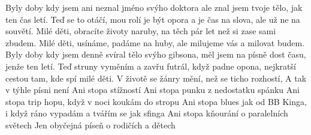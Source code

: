 \ve{}
Byly doby kdy jsem ani neznal jméno svýho doktora
ale znal jsem tvoje tělo, jak ten čas letí.
Teď se to otáčí, mou rolí je být opora
a je čas na slova, ale už ne na souvětí.
\cho{}
Milé děti, obracíte životy naruby,
na těch pár let než si zase sami zbudem.
Milé děti, usínáme, padáme na huby,
ale milujeme vás a milovat budem.
\ve{}
Byly doby kdy jsem denně svíral tělo svýho gibsona,
měl jsem na písně dost času, jenže ten letí.
Teď struny vyměním a zavřu futrál, když padne opona,
nejkratší cestou tam, kde spí milé děti.
\cho{}
\ve{}
V životě se žánry mění, než se ticho rozhostí,
A tak v týhle písni není Ani stopa stížností
Ani stopa punku z nedostatku spánku
Ani stopa trip hopu, když v noci koukám do stropu
Ani stopa blues jak od BB Kinga, i když ráno vypadám a tvářím se jak sfinga
Ani stopa kňourání o paralelních světech
Jen obyčejná píseň o rodičích a dětech
\cho{}
\esong{}